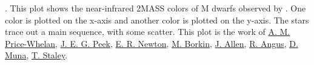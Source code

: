 \textbf{\label{fig:1}}. This plot shows the near-infrared 2MASS colors of M dwarfs observed by \citet{2014AJ....147...20N}. One color is plotted on the x-axis and another color is plotted on the y-axis. The stars trace out a main sequence, with some scatter. This plot is the work of \href{http://adrian.pw}{A. M. Price-Whelan}, \href{http://www.astro.columbia.edu/~jpeek/}{J. E. G. Peek}, \href{https://www.cfa.harvard.edu/~enewton/}{E. R. Newton}, \href{http://people.seas.harvard.edu/~borkin/}{M. Borkin}, \href{http://www.physics.usyd.edu.au/~jallen/}{J. Allen}, \href{http://www.ruthangus.co.uk/}{R. Angus}, \href{}{D. Muna}, \href{http://www.ast.cam.ac.uk/~ts337/}{T. Staley}. 